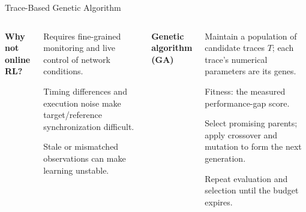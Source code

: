 \source{}
\begin{frame}[t]{Trace-Based Genetic Algorithm}
\bodyfont
\vspace{12pt}
\begin{columns}[T,onlytextwidth]
\column{425pt}
{\color{SemBlue}\textbf{Why not online RL?}}\par
\begin{points}
\item Requires fine-grained monitoring and live control of network conditions.
\item Timing differences and execution noise make target/reference synchronization difficult.
\item Stale or mismatched observations can make learning unstable.
\end{points}
\column{425pt}
\pause
{\color{SemBlue}\textbf{Genetic algorithm (GA)}}\par
\begin{points}
\item Maintain a population of candidate traces $T$; each trace's numerical parameters are its genes.
\item Fitness: the measured performance-gap score.
\item Select promising parents; apply crossover and mutation to form the next generation.
\item Repeat evaluation and selection until the budget expires.
\end{points}
\end{columns}
\end{frame}

